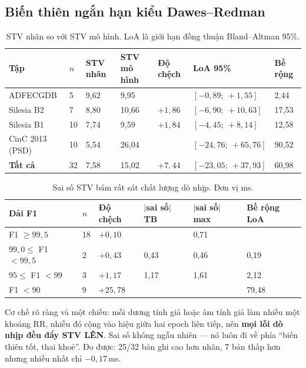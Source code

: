 \subsection{Biến thiên ngắn hạn kiểu Dawes--Redman}

\begin{table}[H]\centering\small
\caption{STV nhãn so với STV mô hình. LoA là giới hạn đồng thuận Bland--Altman 95\%.}
\label{tab:stv}
\begin{tabular}{@{}L{3.6cm} C{0.8cm} C{1.8cm} C{1.8cm} C{1.7cm} C{2.8cm} C{1.6cm}@{}}
\toprule
\textbf{Tập} & $n$ & \textbf{STV nhãn} & \textbf{STV mô hình} & \textbf{Độ chệch} & \textbf{LoA 95\%} &
\textbf{Bề rộng} \\
\midrule
ADFECGDB & 5 & 9,62 & 9,95 &  & $[-0{,}89;\ +1{,}55]$ & 2,44 \\
Silesia B2 & 7 & 8,80 & 10,66 & $+1{,}86$ & $[-6{,}90;\ +10{,}63]$ & 17,53 \\
Silesia B1 & 10 & 7,74 & 9,59 & $+1{,}84$ & $[-4{,}45;\ +8{,}14]$ & 12,58 \\
CinC 2013 (PSD) & 10 & 5,54 & 26,04 &  & $[-24{,}76;\ +65{,}76]$ & 90,52 \\
\midrule
\textbf{Tất cả} & 32 & 7,58 & 15,02 & $+7{,}44$ & $[-23{,}05;\ +37{,}93]$ & 60,98 \\
\bottomrule
\end{tabular}
\end{table}

\begin{table}[H]\centering\small
\caption{Sai số STV bám rất sát chất lượng dò nhịp. Đơn vị ms.}
\label{tab:stv_f1}
\begin{tabular}{@{}L{4.0cm} C{0.9cm} C{2.0cm} C{2.2cm} C{2.2cm} C{2.4cm}@{}}
\toprule
\textbf{Dải F1} & $n$ & \textbf{Độ chệch} & \textbf{$|$sai số$|$ TB} & \textbf{$|$sai số$|$ max} &
\textbf{Bề rộng LoA} \\
\midrule
F1 $\geq 99{,}5$ & 18 & $+0{,}10$ &  & 0,71 &  \\
$99{,}0 \leq$ F1 $< 99{,}5$ & 2 & $+0{,}43$ & 0,43 & 0,46 & 0,19 \\
$95 \leq$ F1 $< 99$ & 3 & $+1{,}17$ & 1,17 & 1,61 & 2,12 \\
F1 $< 90$ & 9 & $+25{,}78$ &  &  & 79,48 \\
\bottomrule
\end{tabular}
\end{table}

Cơ chế rõ ràng và một chiều: mỗi dương tính giả hoặc âm tính giả làm nhiễu một khoảng RR, nhiễu đó cộng
vào hiệu giữa hai epoch liên tiếp, nên \textbf{mọi lỗi dò nhịp đều đẩy STV LÊN}. Sai số không ngẫu nhiên
--- nó luôn đi về phía ``biến thiên tốt, thai khoẻ''. Đo được: 25/32 bản ghi cao hơn nhãn, 7 bản thấp hơn
nhưng nhiều nhất chỉ $-0{,}17$\,ms.

